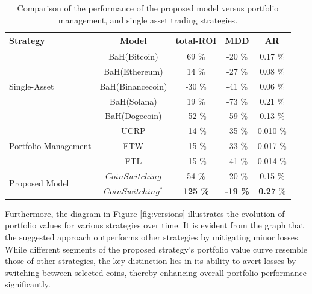 \begin{table}[h]
	\centering
	\caption{Comparison of the performance of the proposed model versus portfolio management, and single asset trading strategies.}
	\label{tbl:cmp}
	\begin{tabular}{l| c | c | c | c  }
		Strategy & Model & total-ROI & MDD & AR \\
		\hline
		\hline
		\multirow{5}{*}{Single-Asset} 	& BaH(Bitcoin) & 69 \%  & -20 \% & 0.17 \% \\
										& BaH(Ethereum) & 14 \%  & -27 \% & 0.08  \% \\
										& BaH(Binancecoin) & -30 \%  & -41 \% & 0.06  \% \\
										& BaH(Solana) & 19 \%  & -73 \% & 0.21 \% \\
										& BaH(Dogecoin) & -52 \%  & -59 \% & 0.13  \% \\
		\hline
		\hline
		\multirow{3}{*}{Portfolio Management} 	& UCRP & -14 \%  & -35 \% & 0.010 \% \\
												& FTW & -15 \%  & -33 \% & 0.017  \% \\
												& FTL & -15 \%  & -41 \% & 0.014  \% \\
		\hline
		\hline
		\multirow{2}{*}{Proposed Model}  	& $CoinSwitching$ &  54 \%  & -20 \%  & 0.15 \%\\
											& $CoinSwitching^*$ & \textbf{125 \%}  & \textbf{-19 \%} & \textbf{0.27}  \% \\
	\end{tabular}
\end{table}

Furthermore, the diagram in Figure \ref{fig:versions} illustrates the evolution of portfolio values for various strategies over time. It is evident from the graph that the suggested approach outperforms other strategies by mitigating minor losses. While different segments of the proposed strategy's portfolio value curve resemble those of other strategies, the key distinction lies in its ability to avert losses by switching between selected coins, thereby enhancing overall portfolio performance significantly.


